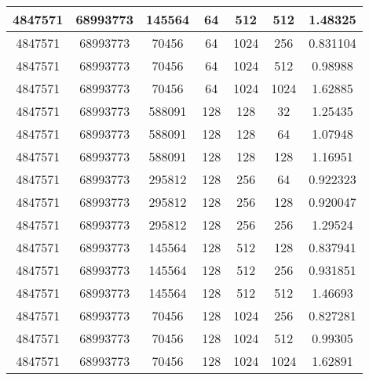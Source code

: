 \documentclass[9pt]{article}
\begin{document}
\begin{tabular}{|c|c|c|c|c|c|c| }
\hline
4847571  & 68993773  & 145564  & 64  & 512  & 512  & 1.48325 \\
\hline
4847571  & 68993773  & 70456  & 64  & 1024  & 256  & 0.831104 \\
\hline
4847571  & 68993773  & 70456  & 64  & 1024  & 512  & 0.98988 \\
\hline
4847571  & 68993773  & 70456  & 64  & 1024  & 1024  & 1.62885 \\
\hline
4847571  & 68993773  & 588091  & 128  & 128  & 32  & 1.25435 \\
\hline
4847571  & 68993773  & 588091  & 128  & 128  & 64  & 1.07948 \\
\hline
4847571  & 68993773  & 588091  & 128  & 128  & 128  & 1.16951 \\
\hline
4847571  & 68993773  & 295812  & 128  & 256  & 64  & 0.922323 \\
\hline
4847571  & 68993773  & 295812  & 128  & 256  & 128  & 0.920047 \\
\hline
4847571  & 68993773  & 295812  & 128  & 256  & 256  & 1.29524 \\
\hline
4847571  & 68993773  & 145564  & 128  & 512  & 128  & 0.837941 \\
\hline
4847571  & 68993773  & 145564  & 128  & 512  & 256  & 0.931851 \\
\hline
4847571  & 68993773  & 145564  & 128  & 512  & 512  & 1.46693 \\
\hline
4847571  & 68993773  & 70456  & 128  & 1024  & 256  & 0.827281 \\
\hline
4847571  & 68993773  & 70456  & 128  & 1024  & 512  & 0.99305 \\
\hline
4847571  & 68993773  & 70456  & 128  & 1024  & 1024  & 1.62891 \\
\hline
\end{tabular}
 
\end{document}
